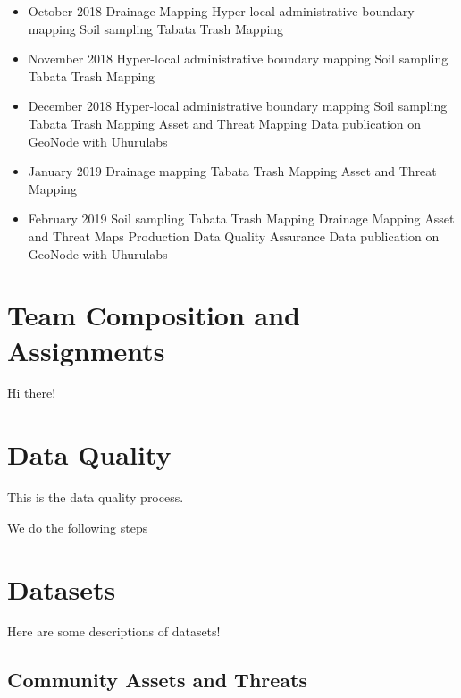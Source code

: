\documentclass[a4paper,12pt,twoside]{article}
\begin{document}
\bigskip

\begin{itemize}
    \item October 2018
Drainage Mapping
Hyper-local administrative boundary mapping
Soil sampling
Tabata Trash Mapping
    \item November 2018
Hyper-local administrative boundary mapping
Soil sampling
Tabata Trash Mapping
    \item December 2018
Hyper-local administrative boundary mapping
Soil sampling
Tabata Trash Mapping
Asset and Threat Mapping
Data publication on GeoNode with Uhurulabs
    \item January 2019
Drainage mapping
Tabata Trash Mapping
Asset and Threat Mapping
    \item February 2019
Soil sampling
Tabata Trash Mapping
Drainage Mapping
Asset and Threat Maps Production
Data Quality Assurance
Data publication on GeoNode with Uhurulabs
\end{itemize}

\section{Team Composition and Assignments}
Hi there!

\section{Data Quality}
This is the data quality process. 

We do the following steps


\section{Datasets}
Here are some descriptions of datasets!

\newpage
\subsection{Community Assets and Threats}
\end{document}
